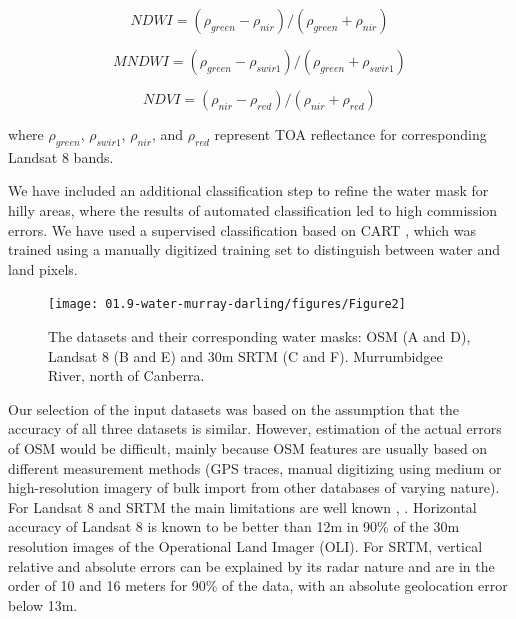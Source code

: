 \begin{equation}
NDWI = \left(\rho_{green}-\rho_{nir} \right) / \left(\rho_{green} + \rho_{nir} \right)
\label{eq:au_NDWI}
\end{equation}

\begin{equation}
MNDWI = \left(\rho_{green}-\rho_{swir1} \right) / \left(\rho_{green} + \rho_{swir1} \label{eq:au_MNDWI}
\right)
\end{equation}

\begin{equation}
NDVI=\left(\rho_{nir} - \rho_{red}\right) / \left(\rho_{nir} + \rho_{red} \right)
\label{eq:au_NDVI}
\end{equation}

where $\rho_{green}$, $\rho_{swir1}$, $\rho_{nir}$, and $\rho_{red}$ represent TOA reflectance for corresponding Landsat 8 bands.

We have included an additional classification step to refine the water mask for hilly areas, where the results of automated classification led to high commission errors. We have used a supervised classification based on \gls{CART} \citet{Breiman1984}, which was trained using a manually digitized training set to distinguish between water and land pixels. 

\begin{figure}
	\centering
	\texttt{[image: 01.9-water-murray-darling/figures/Figure2]}
	\caption{The datasets and their corresponding water masks: \gls{OSM} (A and D), Landsat 8 (B and E) and 30m \gls{SRTM} (C and F). Murrumbidgee River, north of Canberra.}
	\label{fig:au-datasets}
\end{figure}

Our selection of the input datasets was based on the assumption that the accuracy of all three datasets is similar. However, estimation of the actual errors of OSM would be difficult, mainly because OSM features are usually based on different measurement methods (GPS traces, manual digitizing using medium or high-resolution imagery of bulk import from other databases of varying nature). For Landsat 8 and \gls{SRTM} the main limitations are well known \citet{Roy2014}, \citet{Rodriguez2006}. Horizontal accuracy of Landsat 8 is known to be better than 12m in 90\% of the 30m resolution images of the Operational Land Imager (OLI). For \gls{SRTM}, vertical relative and absolute errors can be explained by its radar nature and are in the order of 10 and 16 meters for 90\% of the data, with an absolute geolocation error below 13m. 

